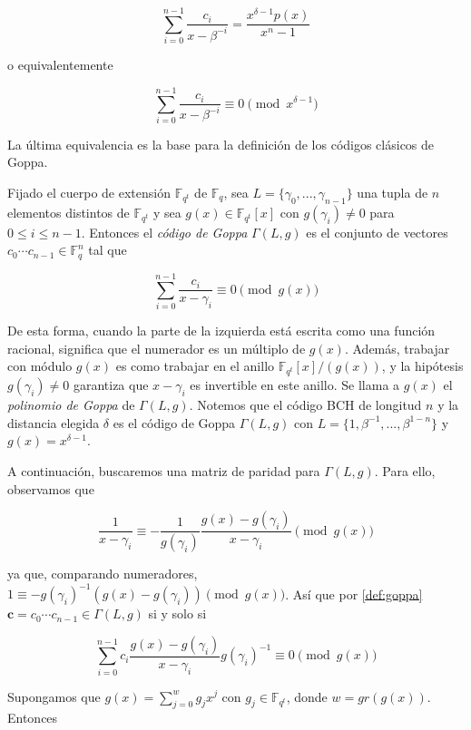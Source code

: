 $$\sum_{i=0}^{n-1} \frac{c_i}{x - \beta ^{-i}} = \frac{x^{\delta - 1} p(x)}{x^n - 1}$$

o equivalentemente

$$\sum_{i=0}^{n-1} \frac{c_i}{x - \beta ^{-i}} \equiv 0 \pmod{x^{\delta - 1}}$$

La última equivalencia es la base para la definición de los códigos clásicos de Goppa.

Fijado el cuerpo de extensión $\mathbb{F}_{q^t}$ de $\mathbb{F}_q$, sea $L = \{ \gamma_0, ..., \gamma_{n-1} \}$ una tupla de $n$ elementos distintos de $\mathbb{F}_{q^t}$ y sea $g(x) \in \mathbb{F}_{q^t}[x]$ con $g(\gamma_i) \neq 0$ para $0 \leq i \leq n - 1$. Entonces el \emph{código de Goppa} $\Gamma(L,g)$ es el conjunto de vectores $c_0 \cdots c_{n-1} \in \mathbb{F}_q^n$ tal que 

\begin{equation}
    \label{def:goppa}
    \sum_{i=0}^{n-1} \frac{c_i}{x - \gamma_i} \equiv 0 \pmod{g(x)}
\end{equation}

De esta forma, cuando la parte de la izquierda está escrita como una función racional, significa que el numerador es un múltiplo de $g(x)$. Además, trabajar con módulo $g(x)$ es como trabajar en el anillo $\mathbb{F}_{q^t}[x]/(g(x))$, y la hipótesis $g(\gamma_i) \neq 0$ garantiza que $x - \gamma_i$ es invertible en este anillo. Se llama a $g(x)$ el \emph{polinomio de Goppa} de $\Gamma(L,g)$. Notemos que el código BCH de longitud $n$ y la distancia elegida $\delta$ es el código de Goppa $\Gamma(L,g)$ con $L = \{ 1, \beta^{-1}, ..., \beta^{1-n} \}$ y $g(x) = x^{\delta - 1}$.

A continuación, buscaremos una matriz de paridad para $\Gamma(L,g)$. Para ello, observamos que

$$\frac{1}{x - \gamma_i} \equiv - \frac{1}{g(\gamma_i)} \frac{g(x) - g(\gamma_i)}{x - \gamma_i} \pmod{ g(x)}$$

ya que, comparando numeradores, $1 \equiv - g(\gamma_i)^{-1} \left( g(x) - g(\gamma_i) \right) \pmod{g(x)}$. Así que por \eqref{def:goppa} $\textbf{c} = c_0 \cdots c_{n-1} \in \Gamma(L,g)$ si y solo si

\begin{equation}
    \label{congruencia_goppa}
    \sum_{i=0}^{n-1} c_i \frac{g(x) - g(\gamma_i)}{x - \gamma_i} g(\gamma_i)^{-1} \equiv 0 \pmod{g(x)}
\end{equation}

Supongamos que $g(x) = \sum_{j=0}^w g_j x^j$ con $g_j \in \mathbb{F}_{q^t}$, donde $w = gr(g(x))$. Entonces

